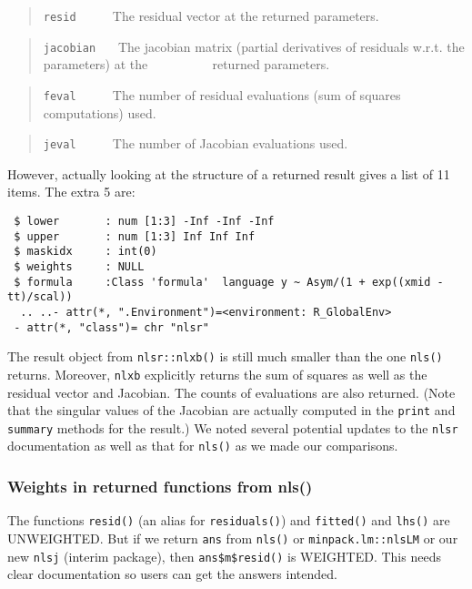\documentclass[
]{article}
\begin{document}
\begin{quote}
\texttt{resid} \(~~~~~~~~~~\) The residual vector at the returned
parameters.
\end{quote}

\begin{quote}
\texttt{jacobian} \(~~~~~\) The jacobian matrix (partial derivatives of
residuals w.r.t. the parameters) at the \newline
\(~~~~~~~~~~~~~~~~~~~~\) returned parameters.
\end{quote}

\begin{quote}
\texttt{feval} \(~~~~~~~~~~\) The number of residual evaluations (sum of
squares computations) used.
\end{quote}

\begin{quote}
\texttt{jeval} \(~~~~~~~~~~\) The number of Jacobian evaluations used.
\end{quote}

However, actually looking at the structure of a returned result gives a
list of 11 items. The extra 5 are:

\begin{verbatim}
 $ lower       : num [1:3] -Inf -Inf -Inf
 $ upper       : num [1:3] Inf Inf Inf
 $ maskidx     : int(0) 
 $ weights     : NULL
 $ formula     :Class 'formula'  language y ~ Asym/(1 + exp((xmid - tt)/scal))
  .. ..- attr(*, ".Environment")=<environment: R_GlobalEnv> 
 - attr(*, "class")= chr "nlsr"
\end{verbatim}

The result object from \texttt{nlsr::nlxb()} is still much smaller than
the one \texttt{nls()} returns. Moreover, \texttt{nlxb} explicitly
returns the sum of squares as well as the residual vector and Jacobian.
The counts of evaluations are also returned. (Note that the singular
values of the Jacobian are actually computed in the \texttt{print} and
\texttt{summary} methods for the result.) We noted several potential
updates to the \texttt{nlsr} documentation as well as that for
\texttt{nls()} as we made our comparisons.

\hypertarget{weights-in-returned-functions-from-nls}{%
\subsubsection{Weights in returned functions from
nls()}\label{weights-in-returned-functions-from-nls}}

The functions \texttt{resid()} (an alias for \texttt{residuals()}) and
\texttt{fitted()} and \texttt{lhs()} are UNWEIGHTED. But if we return
\texttt{ans} from \texttt{nls()} or \texttt{minpack.lm::nlsLM} or our
new \texttt{nlsj} (interim package), then \texttt{ans\$m\$resid()} is
WEIGHTED. This needs clear documentation so users can get the answers
intended.
\end{document}

